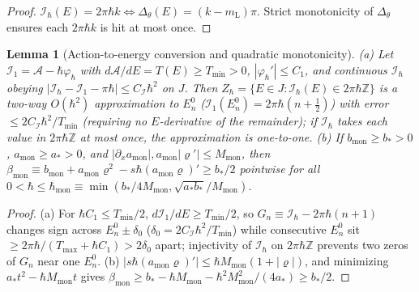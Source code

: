 \documentclass[aps,prd,onecolumn,tightenlines,nofootinbib,notitlepage,10pt,floatfix]{revtex4-2}
\theoremstyle{indentedtheorem}
\newtheorem{lemma}{Lemma}
\begin{document}
\begin{proof}
$\mathcal{I}_\hbar(E)=2\pi\hbar k\iff\Delta_\theta(E)=(k-m_\text{L})\pi$. Strict monotonicity of $\Delta_\theta$ ensures each $2\pi\hbar k$ is hit at most once.
\end{proof}

\begin{lemma}[Action-to-energy conversion and quadratic monotonicity]\label{lem:action_monotone}
(a) Let $\mathcal{I}_1=\mathcal{A}-\hbar\varphi_\hbar$ with $d\mathcal{A}/dE=T(E)\ge T_{\min}>0$, $|\varphi_\hbar'|\le C_1$, and continuous $\mathcal{I}_\hbar$ obeying $|\mathcal{I}_\hbar-\mathcal{I}_1-\pi\hbar|\le C_\mathcal{I}\hbar^2$ on $J$. Then $Z_\hbar=\{E\in J:\mathcal{I}_\hbar(E)\in 2\pi\hbar\mathbb{Z}\}$ is a two-way $O(\hbar^2)$ approximation to $E_n^0$ ($\mathcal{I}_1(E_n^0)=2\pi\hbar(n+\tfrac{1}{2})$) with error $\le 2C_\mathcal{I}\hbar^2/T_{\min}$ (requiring no $E$-derivative of the remainder); if $\mathcal{I}_\hbar$ takes each value in $2\pi\hbar\mathbb{Z}$ at most once, the approximation is one-to-one.
(b) If $b_\text{mon}\ge b_*>0$, $a_\text{mon}\ge a_*>0$, and $|\partial_x a_\text{mon}|,a_\text{mon}|\varrho'|\le M_\text{mon}$, then $\beta_\text{mon}\equiv b_\text{mon}+a_\text{mon}\varrho^2-s\hbar(a_\text{mon}\varrho)'\ge b_*/2$ pointwise for all $0<\hbar\le\hbar_\text{mon}\equiv\min(b_*/4M_\text{mon},\sqrt{a_*b_*}/M_\text{mon})$.
\end{lemma}
\begin{proof}
(a) For $\hbar C_1\le T_{\min}/2$, $d\mathcal{I}_1/dE\ge T_{\min}/2$, so $G_n\equiv\mathcal{I}_\hbar-2\pi\hbar(n+1)$ changes sign across $E_n^0\pm\delta_0$ ($\delta_0=2C_\mathcal{I}\hbar^2/T_{\min}$) while consecutive $E_n^0$ sit $\ge 2\pi\hbar/(T_{\max}+\hbar C_1)>2\delta_0$ apart; injectivity of $\mathcal{I}_\hbar$ on $2\pi\hbar\mathbb{Z}$ prevents two zeros of $G_n$ near one $E_n^0$.
(b) $|s\hbar(a_\text{mon}\varrho)'|\le\hbar M_\text{mon}(1+|\varrho|)$, and minimizing $a_* t^2-\hbar M_\text{mon}t$ gives $\beta_\text{mon}\ge b_*-\hbar M_\text{mon}-\hbar^2 M_\text{mon}^2/(4a_*)\ge b_*/2$.
\end{proof}
\end{document}

